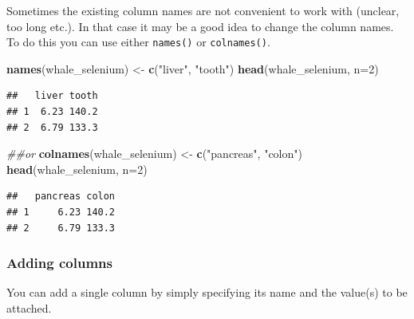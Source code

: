 \documentclass[]{book}
\newenvironment{Shaded}{\begin{snugshade}}{\end{snugshade}}
\newcommand{\CommentTok}[1]{\textcolor[rgb]{0.56,0.35,0.01}{\textit{#1}}}
\newcommand{\DataTypeTok}[1]{\textcolor[rgb]{0.13,0.29,0.53}{#1}}
\newcommand{\DecValTok}[1]{\textcolor[rgb]{0.00,0.00,0.81}{#1}}
\newcommand{\KeywordTok}[1]{\textcolor[rgb]{0.13,0.29,0.53}{\textbf{#1}}}
\newcommand{\NormalTok}[1]{#1}
\newcommand{\OperatorTok}[1]{\textcolor[rgb]{0.81,0.36,0.00}{\textbf{#1}}}
\newcommand{\StringTok}[1]{\textcolor[rgb]{0.31,0.60,0.02}{#1}}
\begin{document}
Sometimes the existing column names are not convenient to work with (unclear, too long etc.). In that case it may be a good idea to change the column names. To do this you can use either \texttt{names()} or \texttt{colnames()}.

\begin{Shaded}
\begin{Highlighting}[]
\KeywordTok{names}\NormalTok{(whale_selenium) <-}\StringTok{ }\KeywordTok{c}\NormalTok{(}\StringTok{"liver"}\NormalTok{, }\StringTok{"tooth"}\NormalTok{)}
\KeywordTok{head}\NormalTok{(whale_selenium, }\DataTypeTok{n=}\DecValTok{2}\NormalTok{)}
\end{Highlighting}
\end{Shaded}

\begin{verbatim}
##   liver tooth
## 1  6.23 140.2
## 2  6.79 133.3
\end{verbatim}

\begin{Shaded}
\begin{Highlighting}[]
\CommentTok{##or}
\KeywordTok{colnames}\NormalTok{(whale_selenium) <-}\StringTok{ }\KeywordTok{c}\NormalTok{(}\StringTok{"pancreas"}\NormalTok{, }\StringTok{"colon"}\NormalTok{)}
\KeywordTok{head}\NormalTok{(whale_selenium, }\DataTypeTok{n=}\DecValTok{2}\NormalTok{)}
\end{Highlighting}
\end{Shaded}

\begin{verbatim}
##   pancreas colon
## 1     6.23 140.2
## 2     6.79 133.3
\end{verbatim}

\hypertarget{adding-columns}{%
\subsubsection*{Adding columns}\label{adding-columns}}

You can add a single column by simply specifying its name and the value(s) to be attached.

\begin{Shaded}
\end{Shaded}
\end{document}
